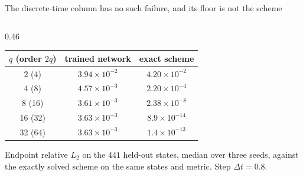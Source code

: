 \documentclass[aspectratio=169,10pt]{beamer}
\begin{document}
\begin{frame}[shrink=25]{The discrete-time column has no such failure, and its floor is not the scheme}
  \vspace{1mm}
  \begin{columns}[T]
    \begin{column}{0.46\textwidth}
      \centering\small
      \begin{tabular}{@{}ccc@{}}
        \toprule
        $q$ (order $2q$) & trained network & exact scheme \\
        \midrule
        2 (4)   & $3.94\times10^{-2}$ & $4.20\times10^{-2}$ \\
        4 (8)   & $4.57\times10^{-3}$ & $2.20\times10^{-4}$ \\
        8 (16)  & $3.61\times10^{-3}$ & $2.38\times10^{-8}$ \\
        16 (32) & $3.63\times10^{-3}$ & $8.9\times10^{-14}$ \\
        32 (64) & $3.63\times10^{-3}$ & $1.4\times10^{-13}$ \\
        \bottomrule
      \end{tabular}
      \smallskip

      {\scriptsize Endpoint relative $L_2$ on the $441$ held-out states, median
       over three seeds, against the exactly solved scheme on the same states
       and metric. Step $\Delta t = 0.8$.}
      \smallskip


\end{column}
\end{columns}
\end{frame}
\end{document}
